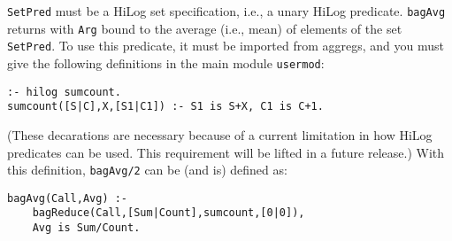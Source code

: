 \begin{description}
    {\tt SetPred} must be a HiLog set specification, i.e., a unary
    HiLog predicate.  {\tt bagAvg} returns with {\tt Arg} bound to the
    average (i.e., mean) of elements of the set {\tt SetPred}.  To use
    this predicate, it must be imported from aggregs, and you must give
    the following definitions in the main module {\tt usermod}:
\begin{verbatim}
:- hilog sumcount.
sumcount([S|C],X,[S1|C1]) :- S1 is S+X, C1 is C+1.
\end{verbatim}
    (These decarations are necessary because of a current limitation in
    how HiLog predicates can be used.  This requirement will be lifted in
    a future release.)  With this definition, {\tt bagAvg/2} can be (and
    is) defined as:
\begin{verbatim}
bagAvg(Call,Avg) :- 
    bagReduce(Call,[Sum|Count],sumcount,[0|0]),
    Avg is Sum/Count.
\end{verbatim}

\end{description}


